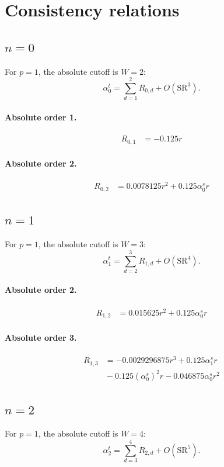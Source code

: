 \documentclass[10pt]{article}
\begin{document}
\section{Consistency relations}
\subsection{$n=0$}
For $p=1$, the absolute cutoff is $W=2$:
\[\alpha_{0}^t=\sum_{d=1}^{2}R_{0,d}+O(\mathrm{SR}^{3}).\]
\paragraph{Absolute order 1.}
\begin{align*}
R_{0,1} &=  - 0.125 r
\end{align*}

\paragraph{Absolute order 2.}
\begin{align*}
R_{0,2} &= 0.0078125 r^{2} + 0.125 \alpha_{0}^s r
\end{align*}

\subsection{$n=1$}
For $p=1$, the absolute cutoff is $W=3$:
\[\alpha_{1}^t=\sum_{d=2}^{3}R_{1,d}+O(\mathrm{SR}^{4}).\]
\paragraph{Absolute order 2.}
\begin{align*}
R_{1,2} &= 0.015625 r^{2} + 0.125 \alpha_{0}^s r
\end{align*}

\paragraph{Absolute order 3.}
\begin{align*}
R_{1,3} &=  - 0.0029296875 r^{3} + 0.125 \alpha_{1}^s r \\
&{}  - 0.125 \left(\alpha_{0}^s\right)^{2} r - 0.046875 \alpha_{0}^s r^{2}
\end{align*}

\subsection{$n=2$}
For $p=1$, the absolute cutoff is $W=4$:
\[\alpha_{2}^t=\sum_{d=3}^{4}R_{2,d}+O(\mathrm{SR}^{5}).\]
\end{document}
